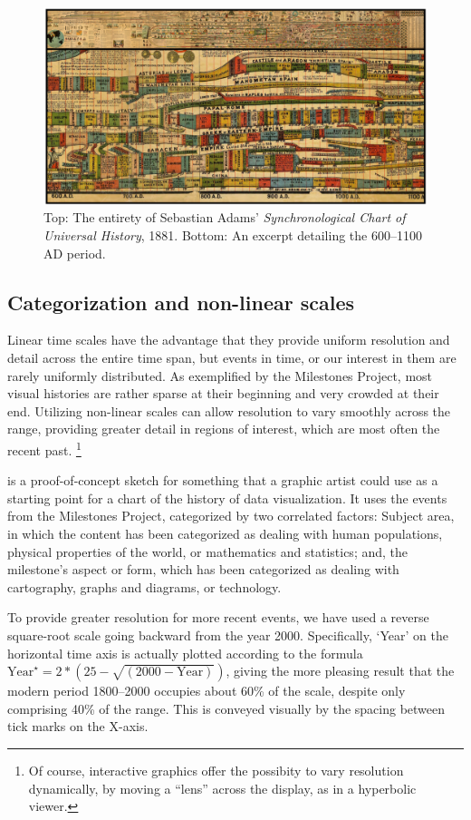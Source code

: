 \begin{figure}[!htb]
  \centering
  \includegraphics[width=\textwidth,clip]{fig/Adams1881-5}
  \caption{Top: The entirety of Sebastian Adams' \emph{Synchronological Chart of Universal History}, 1881. Bottom: An excerpt detailing the 600--1100 AD period. }
  \label{fig:Adams1881}
\end{figure}

\subsection{Categorization and non-linear scales}
Linear time scales have the advantage that they provide uniform resolution and detail across the entire time span, but events in time, or our interest in them are rarely uniformly distributed. As exemplified by the Milestones Project, most visual histories are rather sparse at their beginning and very crowded at their end. Utilizing non-linear scales can allow resolution to vary smoothly across the range, providing greater detail in regions of interest, which are most often the recent past.%
\footnote{
Of course, interactive graphics offer the possibity to vary resolution dynamically, by moving a ``lens'' across the display, as in
a hyperbolic viewer.
}

 is a proof-of-concept sketch for something that a graphic artist could use as a starting point for a chart of the history of data visualization. It uses the events from the Milestones Project, categorized by two correlated factors: Subject area, in which the content has been categorized as dealing with human populations, physical properties of the world, or mathematics and statistics; and, the milestone's aspect or form, which has been categorized as dealing with cartography, graphs and diagrams, or technology. 

To provide greater resolution for more recent events, we have used a reverse square-root scale going backward from the year 2000. Specifically, `Year' on the horizontal time axis is actually plotted according to the formula $\textrm{Year}^\star = 2* (25 - \sqrt{(2000 - \textrm{Year})})$, giving the more pleasing result that the modern period 1800--2000 occupies about 60\% of the scale, despite only comprising 40\% of the range.  This is conveyed visually by the spacing between tick marks on the X-axis.

